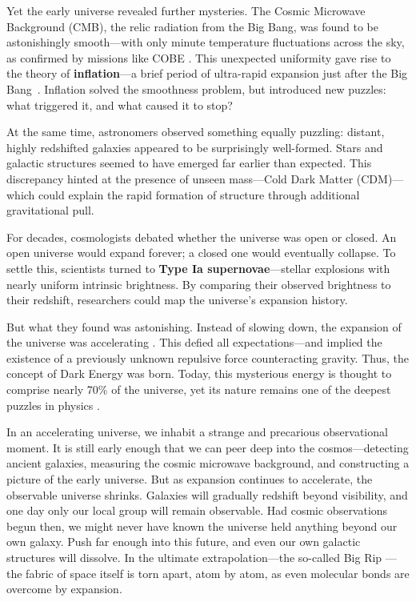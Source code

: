 \documentclass[12pt]{article}
\begin{document}
Yet the early universe revealed further mysteries. The Cosmic Microwave Background (CMB), the relic radiation from the Big Bang, was found to be astonishingly smooth---with only minute temperature fluctuations across the sky, as confirmed by missions like COBE \citep{smoot1992}. This unexpected uniformity gave rise to the theory of \textbf{inflation}---a brief period of ultra-rapid expansion just after the Big Bang~\citep{guth1981}. Inflation solved the smoothness problem, but introduced new puzzles: what triggered it, and what caused it to stop?

At the same time, astronomers observed something equally puzzling: distant, highly redshifted galaxies appeared to be surprisingly well-formed. Stars and galactic structures seemed to have emerged far earlier than expected. This discrepancy hinted at the presence of unseen mass---Cold Dark Matter (CDM)\citep{blumenthal1984}---which could explain the rapid formation of structure through additional gravitational pull.

For decades, cosmologists debated whether the universe was open or closed. An open universe would expand forever; a closed one would eventually collapse. To settle this, scientists turned to \textbf{Type Ia supernovae}---stellar explosions with nearly uniform intrinsic brightness. By comparing their observed brightness to their redshift, researchers could map the universe’s expansion history.

But what they found was astonishing. Instead of slowing down, the expansion of the universe was accelerating \citep{perlmutter1999, riess1998}. This defied all expectations---and implied the existence of a previously unknown repulsive force counteracting gravity. Thus, the concept of Dark Energy was born. Today, this mysterious energy is thought to comprise nearly 70\% of the universe, yet its nature remains one of the deepest puzzles in physics \citep{planck2018}.

In an accelerating universe, we inhabit a strange and precarious observational moment. It is still early enough that we can peer deep into the cosmos---detecting ancient galaxies, measuring the cosmic microwave background, and constructing a picture of the early universe. But as expansion continues to accelerate, the observable universe shrinks. Galaxies will gradually redshift beyond visibility, and one day only our local group will remain observable. Had cosmic observations begun then, we might never have known the universe held anything beyond our own galaxy. Push far enough into this future, and even our own galactic structures will dissolve. In the ultimate extrapolation---the so-called Big Rip \citep{caldwell2003}---the fabric of space itself is torn apart, atom by atom, as even molecular bonds are overcome by expansion.
\end{document}
